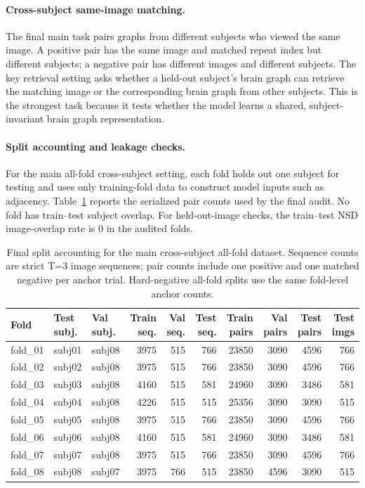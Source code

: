 \documentclass{article}
\begin{document}
\paragraph{Cross-subject same-image matching.}
The final main task pairs graphs from different subjects who viewed the same image. A positive pair has the same image and matched repeat index but different subjects; a negative pair has different images and different subjects. The key retrieval setting asks whether a held-out subject's brain graph can retrieve the matching image or the corresponding brain graph from other subjects. This is the strongest task because it tests whether the model learns a shared, subject-invariant brain graph representation.

\paragraph{Split accounting and leakage checks.}
For the main all-fold cross-subject setting, each fold holds out one subject for testing and uses only training-fold data to construct model inputs such as adjacency. Table~\ref{tab:split_accounting} reports the serialized pair counts used by the final audit. No fold has train--test subject overlap. For held-out-image checks, the train--test NSD image-overlap rate is 0 in the audited folds.

\begin{table}[!htbp]
  \centering
  \caption{Final split accounting for the main cross-subject all-fold dataset. Sequence counts are strict T=3 image sequences; pair counts include one positive and one matched negative per anchor trial. Hard-negative all-fold splits use the same fold-level anchor counts.}
  \label{tab:split_accounting}
  \scriptsize
  \setlength{\tabcolsep}{3.2pt}
  \renewcommand{\arraystretch}{1.12}
  \begin{tabular}{lllrrrrrrr}
    \toprule
    Fold & Test subj. & Val subj. & Train seq. & Val seq. & Test seq. & Train pairs & Val pairs & Test pairs & Test imgs \\
    \midrule
    fold\_01 & subj01 & subj08 & 3975 & 515 & 766 & 23850 & 3090 & 4596 & 766 \\
    fold\_02 & subj02 & subj08 & 3975 & 515 & 766 & 23850 & 3090 & 4596 & 766 \\
    fold\_03 & subj03 & subj08 & 4160 & 515 & 581 & 24960 & 3090 & 3486 & 581 \\
    fold\_04 & subj04 & subj08 & 4226 & 515 & 515 & 25356 & 3090 & 3090 & 515 \\
    fold\_05 & subj05 & subj08 & 3975 & 515 & 766 & 23850 & 3090 & 4596 & 766 \\
    fold\_06 & subj06 & subj08 & 4160 & 515 & 581 & 24960 & 3090 & 3486 & 581 \\
    fold\_07 & subj07 & subj08 & 3975 & 515 & 766 & 23850 & 3090 & 4596 & 766 \\
    fold\_08 & subj08 & subj07 & 3975 & 766 & 515 & 23850 & 4596 & 3090 & 515 \\
    \bottomrule
  \end{tabular}
\end{table}
\end{document}
